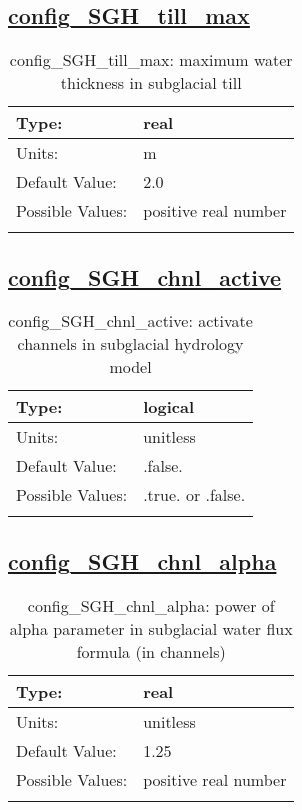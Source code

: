 \subsection[config\_SGH\_till\_max]{\hyperref[sec:nm_tab_subglacial_hydro]{config\_SGH\_till\_max}}
\label{subsec:nm_sec_config_SGH_till_max}
\begin{center}
\begin{longtable}{| p{2.0in} || p{4.0in} |}
    \hline
    Type: & real \\
    \hline
    Units: & \si{m} \\
    \hline
    Default Value: & 2.0 \\
    \hline
    Possible Values: & positive real number \\
    \hline
    \caption{config\_SGH\_till\_max: maximum water thickness in subglacial till}
\end{longtable}
\end{center}
\subsection[config\_SGH\_chnl\_active]{\hyperref[sec:nm_tab_subglacial_hydro]{config\_SGH\_chnl\_active}}
\label{subsec:nm_sec_config_SGH_chnl_active}
\begin{center}
\begin{longtable}{| p{2.0in} || p{4.0in} |}
    \hline
    Type: & logical \\
    \hline
    Units: & \si{unitless} \\
    \hline
    Default Value: & .false. \\
    \hline
    Possible Values: & .true. or .false. \\
    \hline
    \caption{config\_SGH\_chnl\_active: activate channels in subglacial hydrology model}
\end{longtable}
\end{center}
\subsection[config\_SGH\_chnl\_alpha]{\hyperref[sec:nm_tab_subglacial_hydro]{config\_SGH\_chnl\_alpha}}
\label{subsec:nm_sec_config_SGH_chnl_alpha}
\begin{center}
\begin{longtable}{| p{2.0in} || p{4.0in} |}
    \hline
    Type: & real \\
    \hline
    Units: & \si{unitless} \\
    \hline
    Default Value: & 1.25 \\
    \hline
    Possible Values: & positive real number \\
    \hline
    \caption{config\_SGH\_chnl\_alpha: power of alpha parameter in subglacial water flux formula (in channels)}
\end{longtable}
\end{center}
